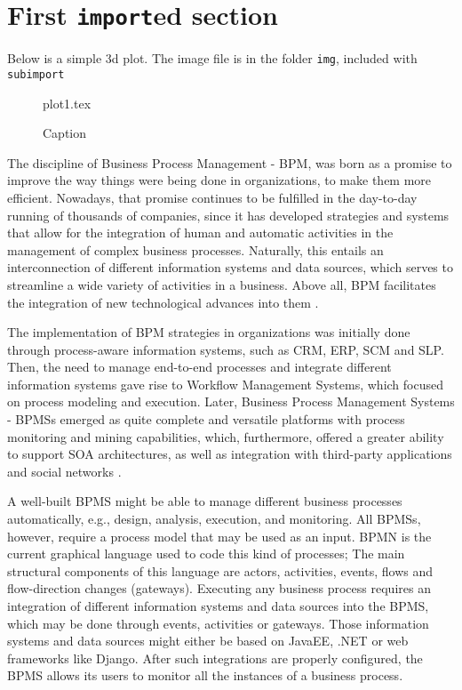 \section{First \texttt{import}ed section}

Below is a simple 3d plot. The image file is in the folder \texttt{img}, included with \texttt{subimport}

\begin{figure}[h]
\centering
{plot1.tex}
\caption{Caption}
\label{fig:my_label}
\end{figure}

The discipline of Business Process Management - BPM, was born as a promise to improve the way things were being done in organizations, to make them more efficient. Nowadays, that promise continues to be fulfilled in the day-to-day running of thousands of companies, since it has developed strategies and systems that allow for the integration of human and automatic activities in the management of complex business processes. Naturally, this entails an interconnection of different information systems and data sources, which serves to streamline a wide variety of activities in a business.  Above all, BPM facilitates the integration of new technological advances into them \cite{Abbott2021,Gazova2022,Harmon2019,Jimenez-Ramirez2021,Plattfaut2022,Ribeiro2022,Rinderle-Ma2021,Roglinger2021}. 

The implementation of BPM strategies in organizations was initially done through process-aware information systems, such as CRM, ERP, SCM and SLP. Then, the need to manage end-to-end processes and integrate different information systems gave rise to Workflow Management Systems, which focused on process modeling and execution. Later, Business Process Management Systems - BPMSs emerged as quite complete and versatile platforms with process monitoring and mining capabilities, which, furthermore, offered a greater ability to support SOA architectures, as well as integration with third-party applications and social networks \cite{Dumas2018}. 

A well-built BPMS might be able to manage different business processes automatically, e.g., design, analysis, execution, and monitoring\cite{Dumas2018}. All BPMSs, however, require a process model that may be used as an input.  BPMN is the current graphical language used to code this kind of processes\cite{OMG2015}; The main structural components of this language are actors, activities, events, flows and flow-direction changes (gateways). Executing any business process requires an integration of different information systems and data sources into the BPMS, which may be done through events, activities or gateways. Those information systems and data sources might either be based on JavaEE, .NET or web frameworks like Django. After such integrations are properly configured, the BPMS allows its users to monitor all the instances of a business process.     

